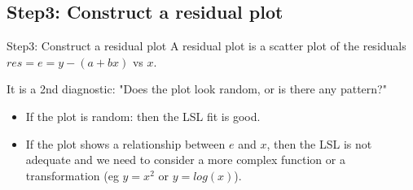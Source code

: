\documentclass[t,xcolor=pdftex,dvipsnames,table]{beamer}\usepackage[]{graphicx}\usepackage[]{color}
\makeatletter
\def\maxwidth{ %
  \ifdim\Gin@nat@width>\linewidth
    \linewidth
  \else
    \Gin@nat@width
  \fi
}
\newcommand{\hlstr}[1]{\textcolor[rgb]{0.192,0.494,0.8}{#1}}%
\newcommand{\hlopt}[1]{\textcolor[rgb]{0,0,0}{#1}}%
\newcommand{\hlstd}[1]{\textcolor[rgb]{0.345,0.345,0.345}{#1}}%
\newcommand{\hlkwc}[1]{\textcolor[rgb]{0.333,0.667,0.333}{#1}}%
\newcommand{\hlkwd}[1]{\textcolor[rgb]{0.737,0.353,0.396}{\textbf{#1}}}%
\newenvironment{kframe}{%
 \def\at@end@of@kframe{}%
 \ifinner\ifhmode%
  \def\at@end@of@kframe{\end{minipage}}%
  \begin{minipage}{\columnwidth}%
 \fi\fi%
 \def\FrameCommand##1{\hskip\@totalleftmargin \hskip-\fboxsep
 \colorbox{shadecolor}{##1}\hskip-\fboxsep
     \hskip-\linewidth \hskip-\@totalleftmargin \hskip\columnwidth}%
 \MakeFramed {\advance\hsize-\width
   \@totalleftmargin\z@ \linewidth\hsize
   \@setminipage}}%
 {\par\unskip\endMakeFramed%
 \at@end@of@kframe}
\newenvironment{knitrout}{}{} %
\makeatother
\begin{document}


\subsection[]{Step3: Construct a residual plot}
\begin{frame}[fragile]{Step3: Construct a residual plot}
A residual plot is a scatter plot of the residuals $res = e = y-(a+bx)$ vs $x$.

\vspace{.5cm}
It is a 2nd diagnostic: "Does the plot look random, or is there any pattern?"
\begin{itemize}
\item
  If the plot is random: then the LSL fit is good.
\item
	If the plot shows a relationship between $e$ and $x$, then the LSL is not adequate and we need to consider a more complex function or a transformation (eg $y=x^2$ or $y=log(x)$).
\end{itemize}
\end{frame} 
  
\end{document}
